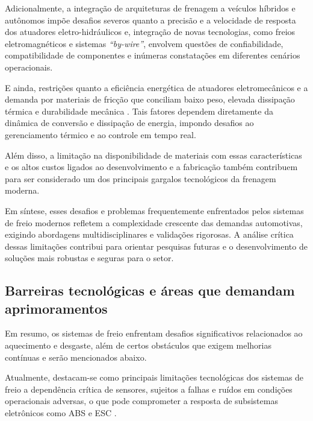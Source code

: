 Adicionalmente, a integração de arquiteturas de frenagem a veículos híbridos e autônomos impõe desafios severos quanto a precisão e a velocidade de resposta dos atuadores eletro-hidráulicos \cite{Donghai2022, Lentin2022} e, integração de novas tecnologias, como freios eletromagnéticos e sistemas \textit{“by-wire”}, envolvem questões de confiabilidade, compatibilidade de componentes e inúmeras constatações em diferentes cenários operacionais.

E ainda, restrições quanto a eficiência energética de atuadores eletromecânicos e a demanda por materiais de fricção que conciliam baixo peso, elevada dissipação térmica e durabilidade mecânica \cite{Donghai2022, AndrewJ2022}. Tais fatores dependem diretamente da dinâmica de conversão e dissipação de energia, impondo desafios ao gerenciamento térmico e ao controle em tempo real.

Além disso, a limitação na disponibilidade de materiais com essas características e os altos custos ligados ao desenvolvimento e a fabricação também contribuem para ser considerado um dos principais gargalos tecnológicos da frenagem moderna.

Em síntese, esses desafios e problemas frequentemente enfrentados pelos sistemas de freio modernos refletem a complexidade crescente das demandas automotivas, exigindo abordagens multidisciplinares e validações rigorosas. A análise crítica dessas limitações contribui para orientar pesquisas futuras e o desenvolvimento de soluções mais robustas e seguras para o setor.






















\subsection{Barreiras tecnológicas e áreas que demandam aprimoramentos}
\label{sec:o-estado-da-arte-5-4}
Em resumo, os sistemas de freio enfrentam desafios significativos relacionados ao aquecimento e desgaste, além de certos obstáculos que exigem melhorias contínuas e serão mencionados abaixo.

Atualmente, destacam-se como principais limitações tecnológicas dos sistemas de freio a dependência crítica de sensores, sujeitos a falhas e ruídos em condições operacionais adversas, o que pode comprometer a resposta de subsistemas eletrônicos como ABS e ESC \cite{Konrad2014, Lentin2022}.

